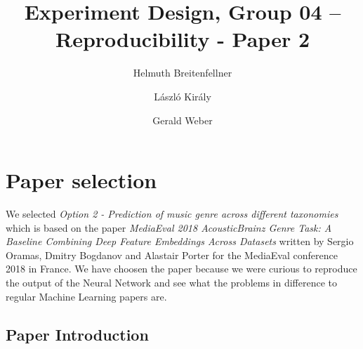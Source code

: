 \documentclass[sigconf,nonacm]{acmart}
\begin{document}
\title{Experiment Design, Group 04 -- Reproducibility - Paper 2}


\author{Helmuth Breitenfellner}
\affiliation{%
}

\author{L\'aszl\'o Kir\'aly}
\affiliation{%
}

\author{Gerald Weber}
\affiliation{%
}


\maketitle

\section{Paper selection}

We selected \textit{Option 2 - Prediction of music genre across different taxonomies} which is based on the paper \textit{MediaEval 2018 AcousticBrainz Genre Task: A Baseline
Combining Deep Feature Embeddings Across Datasets} written by Sergio Oramas, Dmitry Bogdanov and Alastair Porter for the MediaEval conference 2018 in France.
We have choosen the paper because we were curious to reproduce the output of the Neural Network and see what the problems in difference to regular Machine Learning papers are.


\subsection{Paper Introduction}
\end{document}

